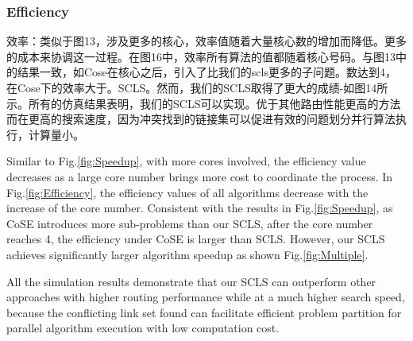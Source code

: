 \subsubsection{Efficiency}

效率：类似于图13，涉及更多的核心，效率值随着大量核心数的增加而降低。更多的成本来协调这一过程。在图16中，效率所有算法的值都随着核心号码。与图13中的结果一致，如Cose在核心之后，引入了比我们的scls更多的子问题。数达到4，在Cose下的效率大于。SCLS。然而，我们的SCLS取得了更大的成绩-如图14所示。所有的仿真结果表明，我们的SCLS可以实现。优于其他路由性能更高的方法而在更高的搜索速度，因为冲突找到的链接集可以促进有效的问题划分并行算法执行，计算量小。


Similar to Fig.\ref{fig:Speedup}, with more cores involved, the efficiency value decreases  as a large core number brings more cost to coordinate the process. In Fig.\ref{fig:Efficiency}, the efficiency values of all algorithms decrease with the increase of the core number. Consistent with the results in Fig.\ref{fig:Speedup}, as CoSE introduces more sub-problems than our SCLS, after the core number reaches 4, the efficiency under CoSE is larger than SCLS. However, our SCLS achieves significantly larger algorithm speedup as shown Fig.\ref{fig:Multiple}. %

All the simulation results demonstrate that our SCLS can outperform other approaches with higher routing performance while at a much higher search speed, because the  conflicting link set found can facilitate efficient problem partition for parallel algorithm execution with low computation cost.

